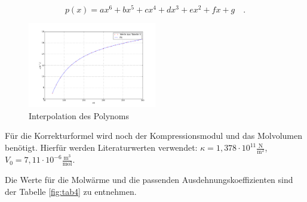 \begin{equation*}
p(x)=ax^6+bx^5+cx^4+dx^3+ex^2+fx+g\quad.
\end{equation*}

\begin{figure}
	\centering
		\includegraphics[width=0.5\textwidth]{inter.png}
	\caption{Interpolation des Polynoms}
	\label{fig:abb1}
\end{figure}

\noindent Für die Korrekturformel wird noch der Kompressionsmodul und das Molvolumen benötigt. Hierfür werden Literaturwerten verwendet: \(\kappa=1,378\cdot10^{11}\frac{\text{N}}{\text{m}^2}\), \(V_0=7,11\cdot10^{-6}\frac{\text{m}^3}{\text{mol}}\). 

\noindent Die Werte für die Molwärme und die passenden Ausdehnungskoeffizienten sind der Tabelle \ref{fig:tab4} zu entnehmen.

